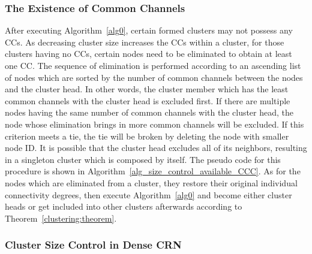 \documentclass[times]{ettauth}
\newcommand{\ie}{i.e., }
\theoremstyle{mytheoremstyle}
\theoremstyle{mytheoremstyle}
\theoremstyle{mytheoremstyle}
\begin{document}
\subsubsection{The Existence of Common Channels}
\label{ross_p1_guarantee_ccc}
After executing Algorithm~\ref{alg0}, certain formed clusters may not possess any CCs.
As decreasing cluster size increases the CCs within a cluster, for those clusters having no CCs, certain nodes need to be eliminated to obtain at least one CC.
The sequence of elimination is performed according to an ascending list of nodes which are sorted by the number of common channels between the nodes and the cluster head. 
In other words, the cluster member which has the least common channels with the cluster head is excluded first.
If there are multiple nodes having the same number of common channels with the cluster head, the node whose elimination brings in more common channels will be excluded.
If this criterion meets a tie, the tie will be broken by deleting the node with smaller node ID.
It is possible that the cluster head excludes all of its neighbors, resulting in a singleton cluster which is composed by itself.
The pseudo code for this procedure is shown in Algorithm~\ref{alg_size_control_available_CCC}.
As for the nodes which are eliminated from a cluster, they restore their original individual connectivity degrees, then execute Algorithm~\ref{alg0} and become either cluster heads or get included into other clusters afterwards according to Theorem~\ref{clustering:theorem}.




\subsubsection{Cluster Size Control in Dense CRN}
\label{ross_p2_cluster_pruning}
\end{document}

